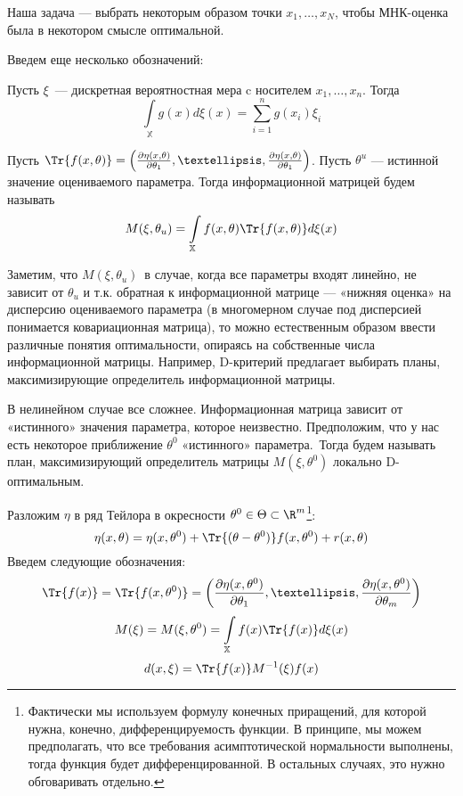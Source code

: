 Наша задача — выбрать некоторым образом точки $x_1, …, x_N$, чтобы МНК-оценка была в некотором смысле оптимальной. 

Введем еще несколько обозначений:
\begin{dfn}
Пусть $\xi$ — дискретная вероятностная мера c носителем $x_1,…, x_n$. Тогда
$$ \int\limits_{\mathbb{X}} g(x) d\xi(x) = \sum \limits_{i=1}^{n}  g(x_i)\xi_i$$
\end{dfn}

\begin{dfn}
Пусть $\Tr{f(x,\theta)} = \left(\frac{\partial\eta(x,\theta)}{\partial \theta_1}, …, \frac{\partial\eta(x,\theta)}{\partial \theta_1}\right)$. 
Пусть $\theta^u$ — истинной значение оцениваемого параметра. Тогда информационной матрицей будем называть
$$M(\xi, \theta_u) = \int\limits_{\mathbb{X}} f(x, \theta)\Tr{f(x, \theta)}d\xi(x)$$
\end{dfn}


Заметим, что $M(\xi, \theta_u)$ в случае, когда все параметры входят линейно, не зависит от $\theta_u$ и  т.к. обратная к информационной матрице — «нижняя оценка» на дисперсию оцениваемого параметра (в многомерном случае под дисперсией  понимается ковариационная матрица), то можно естественным образом ввести различные понятия оптимальности, опираясь на собственные числа информационной матрицы. Например, D-критерий предлагает выбирать планы, максимизирующие определитель информационной матрицы. 

В нелинейном случае все сложнее. Информационная матрица зависит от «истинного» значения параметра, которое неизвестно. Предположим, что у нас есть некоторое приближение $\theta^0$ «истинного» параметра. Тогда будем называть план, максимизирующий определитель матрицы $M(\xi, \theta^0)$ локально D-оптимальным. 

Разложим $\eta$ в ряд Тейлора в окресности $\theta^0 \in \Theta \subset \R^m$\footnote{Фактически мы используем формулу конечных приращений, для которой нужна, конечно, дифференцируемость функции.
В принципе, мы можем предполагать, что все требования асимптотической нормальности выполнены, тогда функция будет дифференцированной. В остальных случаях, это нужно обговаривать отдельно.}:
$$\eta(x, \theta) = \eta(x, \theta^0) + \Tr{(\theta-\theta^0)}f(x, \theta^0) + r(x,\theta)$$
Введем следующие обозначения:
$$ \Tr{f(x)} = \Tr{f(x, \theta^0)} = \left(\frac{\partial \eta(x, \theta^0)}{\partial\theta_1}, …, \frac{\partial \eta(x, \theta^0)}{\partial \theta_m}\right)$$
$$ M(\xi) = M(\xi, \theta^0) = \int\limits_{\mathbb{X}} f(x) \Tr{f(x)}d\xi(x)$$
$$d(x, \xi) = \Tr{f(x)} M^{-1}(\xi)f(x)$$

